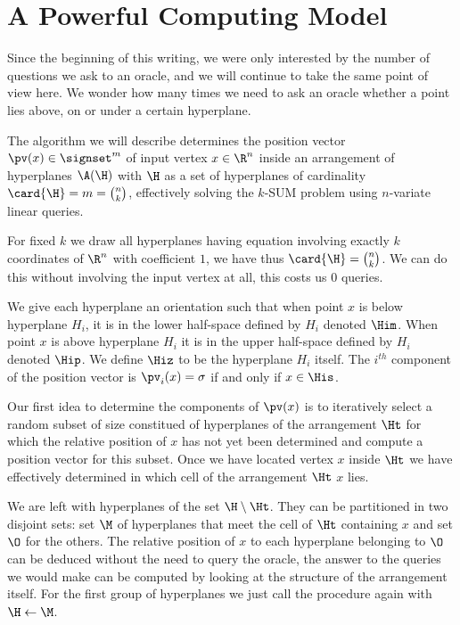 \section{A Powerful Computing Model}


Since the beginning of this writing, we were only interested by the number of
questions we ask to an oracle, and we will continue to take the same point of
view here. We wonder how many times we need to ask an oracle whether a point
lies above, on or under a certain hyperplane.

The algorithm we will describe determines the position vector $\pv(x) \in
\signset^{m}$ of input vertex $x \in \R^n$ inside an
arrangement of hyperplanes $\A(\H)$ with $\H$ as a set of hyperplanes
of cardinality $\card{\H} = m = \binom{n}{k}$,
effectively solving the $k$-SUM problem using  $n$-variate
linear queries.

For fixed $k$ we draw all hyperplanes having equation involving exactly $k$
coordinates of $\R^n$ with coefficient $1$, we have thus $\card{\H} =
\binom{n}{k}$. We can do this without involving the input vertex at all, this
costs us $0$ queries.

We give each hyperplane an orientation such that when point $x$ is below
hyperplane $H_i$, it is in the lower half-space defined by $H_i$ denoted
$\Him$. When point $x$ is above hyperplane $H_i$ it is in the upper
half-space defined by $H_i$ denoted $\Hip$. We define $\Hiz$ to be the
hyperplane $H_i$ itself. The $i^{th}$ component of the position vector is
$\pv_i(x) = \sigma$ if and only if $x \in \His$.

Our first idea to determine the components of $\pv(x)$ is to iteratively
select a random subset of size  constitued of hyperplanes of the
arrangement $\Ht$ for which the relative position of $x$ has not yet been
determined and compute a position vector for this subset. Once we have located
vertex $x$ inside $\Ht$ we have effectively determined in
which cell of the arrangement $\Ht$ $x$ lies.

We are left with hyperplanes of the set $\H \setminus \Ht$. They can be
partitioned in two disjoint sets: set $\M$ of hyperplanes that meet the cell of
$\Ht$ containing $x$ and set $\O$ for the others. The relative position of $x$
to each hyperplane belonging to $\O$ can be deduced without the need to query
the oracle, the answer to the queries we would make can be computed by looking
at the structure of the arrangement itself. For the first group of hyperplanes
we just call the procedure again with $\H \gets \M$.

